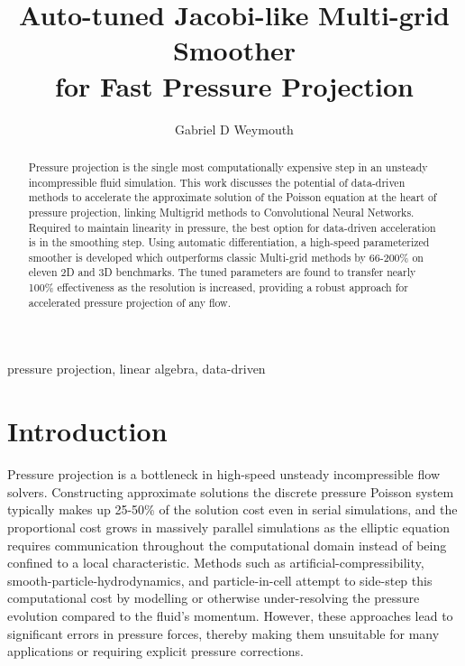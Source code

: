 \documentclass[review]{elsarticle}
\begin{document}
\begin{frontmatter}

\title{Auto-tuned Jacobi-like Multi-grid Smoother\\ for Fast Pressure Projection}

\author{Gabriel D Weymouth}
\address{Engineering and Physical Sciences, University of Southampton, Southampton, UK}
\address{Data-Centric Engineering, Alan Turing Institute, London, UK}

\begin{abstract}
Pressure projection is the single most computationally expensive step in an unsteady incompressible fluid simulation. This work discusses the potential of data-driven methods to accelerate the approximate solution of the Poisson equation at the heart of pressure projection, linking Multigrid methods to Convolutional Neural Networks. Required to maintain linearity in pressure, the best option for data-driven acceleration is in the smoothing step. Using automatic differentiation, a high-speed parameterized smoother is developed which outperforms classic Multi-grid methods by 66-200\% on eleven 2D and 3D benchmarks. The tuned parameters are found to transfer nearly 100\% effectiveness as the resolution is increased, providing a robust approach for accelerated pressure projection of any flow.
\end{abstract}

\begin{keyword}
pressure projection, linear algebra, data-driven
\end{keyword}

\end{frontmatter}

\section{Introduction}

Pressure projection is a bottleneck in high-speed unsteady incompressible flow solvers. Constructing approximate solutions the discrete pressure Poisson system typically makes up 25-50\% of the solution cost even in serial simulations, and the proportional cost grows in massively parallel simulations as the elliptic equation requires communication throughout the computational domain instead of being confined to a local characteristic. Methods such as artificial-compressibility, smooth-particle-hydrodynamics, and particle-in-cell attempt to side-step this computational cost by modelling or otherwise under-resolving the pressure evolution compared to the fluid's momentum. However, these approaches lead to significant errors in pressure forces, thereby making them unsuitable for many applications or requiring explicit pressure corrections.
\end{document}
